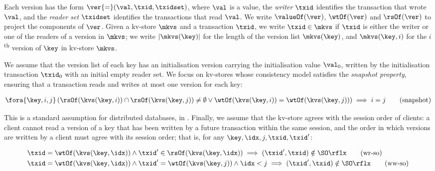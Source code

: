 Each version has the form 
\(\ver {=} (\val, \txid, \txidset)\), where \(\val\) is
a value, the \emph{writer} \(\txid\) identifies the transaction that
wrote \(\val\),  and the \emph{reader set} \(\txidset\) identifies the
transactions that read \(\val\). We write
\(\valueOf(\ver)\),
\(\wtOf(\ver)\) and \(\rsOf(\ver)\) to project
the components of \(\ver\).
Given a kv-store \(\mkvs\) and a transaction \(\txid\), we write 
\(\txid \in \mkvs\) if \(\txid\) is either the writer or 
one of the readers of a version in \(\mkvs\);
we write \(\lvert \mkvs(\key) \rvert\) for the length of the version
list \(\mkvs(\key)\),
and \(\mkvs(\key, i)\) for the \(i\)\textsuperscript{th} version of
\(\key\) in kv-store $\mkvs$.

We assume that the version list of each key has an initialisation version 
carrying the initialisation value \(\val_0\),  written by the 
initialisation transaction \(\txid_0\) with an initial empty reader set.
We focus on kv-stores whose consistency model satisfies the
\emph{snapshot property}, ensuring that
a transaction reads and writes at most one version for each key:

\SpaceAboveMath
\begin{align}
\fora{\key, i, j} 
\left( \rsOf(\kvs(\key, i)) \cap \rsOf(\kvs(\key, j)) \neq \emptyset \lor
\wtOf(\kvs(\key, i)) = \wtOf(\kvs(\key, j)) \right)
\implies i = j  
\tag{snapshot}
\label{equ:kvs-wf-txid-snapshot-property} 
\end{align}
\SpaceBelowMath

\noindent 
This is a standard assumption for distributed databases, \eg in
\cite{ramp,si,distrsi,clocksi,cops,PSI-RA,SI-RA,NMSI,PSI}.
Finally, we assume that the kv-store agrees with the session order of clients: 
a client cannot read a
version of a key that has been written by a future transaction within
the same session, and the order in which versions are written by a
client must agree with its session order; that is, 
for any \( \key,\idx,j,\txid,\txid' \):

\SpaceAboveMath
\begin{align}
& \txid = \wtOf(\kvs(\key,\idx))
\land \txid' \in \rsOf(\kvs(\key,\idx))
\implies (\txid', \txid) \notin \SO\rflx
\tag{wr-so}
\label{equ:kvs-wf-so-wr}
\\ & \txid = \wtOf(\kvs(\key,\idx))
\land \txid' = \wtOf(\kvs(\key,j))
\land \idx < j
\implies (\txid', \txid) \notin \SO\rflx
\tag{ww-so}
\label{equ:kvs-wf-so-ww}
\end{align}
\SpaceBelowMath

